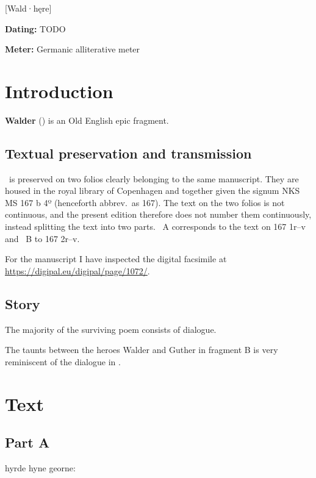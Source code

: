 [Wald·hęre]

\begin{flushright}%
\textbf{Dating:} TODO

\textbf{Meter:} Germanic alliterative meter
\end{flushright}%

\section{Introduction}

\textbf{Walder} (\Waldere) is an Old English epic fragment.

\subsection{Textual preservation and transmission}

\Waldere\ is preserved on two folios clearly belonging to the same manuscript.  They are housed in the royal library of Copenhagen and together given the signum NKS MS 167 b 4º (henceforth abbrev.~as 167).  The text on the two folios is not continuous, and the present edition therefore does not number them continuously, instead splitting the text into two parts.  \Waldere\ A corresponds to the text on 167 1r--v and \Waldere\ B to 167 2r--v.

For the manuscript I have inspected the digital facsimile at \url{https://digipal.eu/digipal/page/1072/}.

\subsection{Story}

The majority of the surviving poem consists of dialogue.

The taunts between the heroes Walder and Guther in fragment B is very reminiscent of the dialogue in .

\sectionline

\newpage

\section{Text}

\subsection{Part A}

\bvg\bva[A]%
{[...]} hyrde hyne georne:\eva

